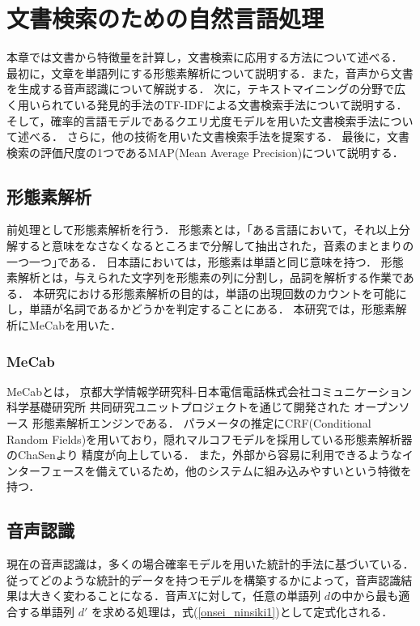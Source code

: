 \chapter{文書検索のための自然言語処理}
本章では文書から特徴量を計算し，文書検索に応用する方法について述べる．
最初に，文章を単語列にする形態素解析について説明する．また，音声から文書を生成する音声認識について解説する．
次に，テキストマイニングの分野で広く用いられている発見的手法のTF-IDFによる文書検索手法について説明する．
そして，確率的言語モデルであるクエリ尤度モデルを用いた文書検索手法について述べる．
さらに，他の技術を用いた文書検索手法を提案する．
最後に，文書検索の評価尺度の1つであるMAP(Mean Average Precision)について説明する．

\section{形態素解析}
前処理として形態素解析を行う．
形態素とは，｢ある言語において，それ以上分解すると意味をなさなくなるところまで分解して抽出された，音素のまとまりの一つ一つ｣である．
日本語においては，形態素は単語と同じ意味を持つ．
形態素解析とは，与えられた文字列を形態素の列に分割し，品詞を解析する作業である．
本研究における形態素解析の目的は，単語の出現回数のカウントを可能にし，単語が名詞であるかどうかを判定することにある．
本研究では，形態素解析にMeCab\cite{MeCab}を用いた．

\subsection{MeCab}
MeCabとは， 京都大学情報学研究科-日本電信電話株式会社コミュニケーション科学基礎研究所 共同研究ユニットプロジェクトを通じて開発された
オープンソース 形態素解析エンジンである．
パラメータの推定にCRF(Conditional Random Fields)を用いており，隠れマルコフモデルを採用している形態素解析器のChaSen\cite{ChaSen}より
精度が向上している．
また，外部から容易に利用できるようなインターフェースを備えているため，他のシステムに組み込みやすいという特徴を持つ．

% 
%

\section{音声認識}
現在の音声認識は，多くの場合確率モデルを用いた統計的手法に基づいている．従ってどのような統計的データを持つモデルを構築するかによって，音声認識結果は大きく変わることになる．音声$X$に対して，任意の単語列 $d$の中から最も適合する単語列 $d'$ を求める処理は，式(\ref{onsei_ninsiki1})として定式化される．\\

